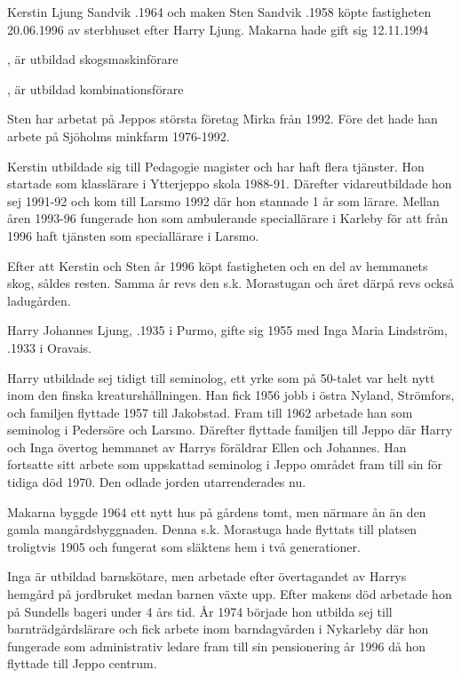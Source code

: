 Kerstin Ljung Sandvik .1964 och maken Sten Sandvik .1958 köpte fastigheten 20.06.1996 av sterbhuset efter Harry Ljung. Makarna hade gift sig 12.11.1994

\begin{jhchildren}
  \item {}, är utbildad skogsmaskinförare
  \item {}, är utbildad kombinationsförare
\end{jhchildren}


Sten har arbetat på Jeppos största företag Mirka från 1992. Före det hade han arbete på Sjöholms minkfarm 1976-1992.

Kerstin utbildade sig till Pedagogie magister och har haft flera tjänster. Hon startade som klasslärare i Ytterjeppo skola 1988-91. Därefter vidareutbildade hon sej 1991-92 och kom till Larsmo 1992 där hon stannade 1 år som lärare. Mellan åren 1993-96 fungerade hon som ambulerande speciallärare i Karleby för att från 1996 haft tjänsten som speciallärare i Larsmo.

Efter att Kerstin och Sten år 1996 köpt fastigheten och en del av hemmanets skog, såldes resten. Samma år revs den s.k. Morastugan och året därpå revs också ladugården.



Harry Johannes Ljung, .1935 i Purmo, gifte sig 1955 med Inga Maria Lindström, .1933 i Oravais.

Harry utbildade sej tidigt till seminolog, ett yrke som på 50-talet var helt nytt inom den finska kreaturshållningen. Han fick 1956 jobb i östra Nyland, Strömfors, och familjen flyttade 1957 till Jakobstad. Fram till 1962 arbetade han som seminolog i Pedersöre och Larsmo. Därefter flyttade familjen till Jeppo där Harry och Inga övertog hemmanet av Harrys föräldrar Ellen och Johannes. Han fortsatte sitt arbete som uppskattad seminolog i Jeppo området fram till sin för tidiga död 1970. Den odlade jorden utarrenderades nu.

Makarna byggde 1964 ett nytt hus på gårdens tomt, men närmare ån än den gamla mangårdsbyggnaden. Denna s.k. Morastuga hade flyttats till platsen troligtvis 1905 och fungerat som släktens hem i två generationer.

Inga är utbildad barnskötare, men arbetade efter övertagandet av Harrys hemgård på jordbruket medan barnen växte upp. Efter makens död arbetade hon på Sundells bageri under 4 års tid. År 1974 började hon utbilda sej till barnträdgårdslärare och fick arbete inom barndagvården i Nykarleby där hon fungerade som administrativ ledare fram till sin pensionering år 1996 då hon flyttade till Jeppo centrum.

